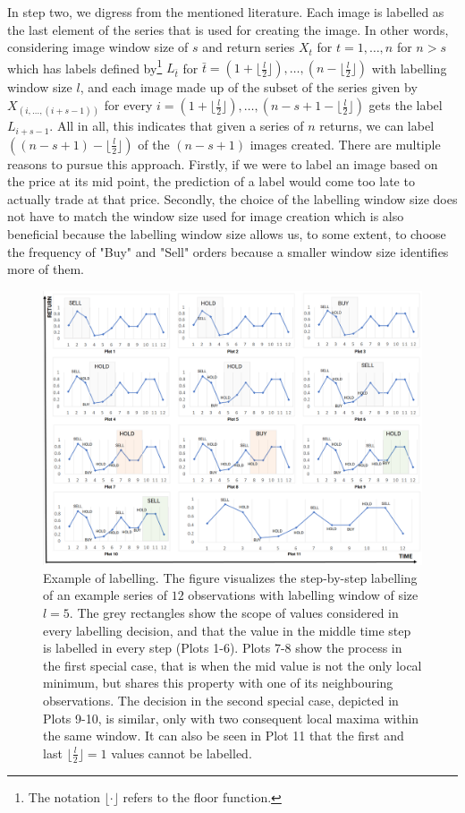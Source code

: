 \documentclass[12pt, a4paper]{article}
\begin{document}
In step two, we digress from the mentioned literature. Each image is labelled as the last element of the series that is used for creating the image. In other words, considering image window size of $s$ and return series $X_t$ for $t = 1, \dots, n$ for $n > s$ which has labels defined by\footnote{The notation $\lfloor \cdot \rfloor$ refers to the floor function.} 
$L_{\bar{t}}$ for 
$\bar{t} = \left(1+\lfloor \frac{l}{2} \rfloor\right), \dots, \left(n-\lfloor \frac{l}{2} \rfloor\right)$ with labelling window size $l$, and each image made up of the subset of the series given by
$X_{(i,\dots,(i+s-1))}$  
for every
$i = \left(1+\lfloor \frac{l}{2} \rfloor\right), \dots, \left(n-s+1-\lfloor \frac{l}{2} \rfloor\right)$ gets the label $L_{i+s-1}$. All in all, this indicates that given a series of $n$ returns, we can label $\left((n - s + 1)-\lfloor \frac{l}{2} \rfloor\right)$ of the $(n - s + 1)$ images created.
There are multiple reasons to pursue this approach. Firstly, if we were to label an image based on the price at its mid point, the prediction of a label would come too late to actually trade at that price. Secondly, the choice of the labelling window size does not have to match the window size used for image creation which is also beneficial because the labelling window size allows us, to some extent, to choose the frequency of "Buy" and "Sell" orders because a smaller window size identifies more of them. 

\begin{figure}[ht]
    \centering
    \includegraphics[width=\textwidth]{images/Labelling.png}
    \caption{Example of labelling. The figure visualizes the step-by-step labelling of an example series of $12$ observations with labelling window of size $l=5$. The grey rectangles show the scope of values considered in every labelling decision, and that the value in the middle time step is labelled in every step (Plots 1-6). Plots 7-8 show the process in the first special case, that is when the mid value is not the only local minimum, but shares this property with one of its neighbouring observations. The decision in the second special case, depicted in Plots 9-10, is similar, only with two consequent local maxima within the same window. It can also be seen in Plot 11 that the first and last $\lfloor \frac{l}{2} \rfloor = 1$ values cannot be labelled.}
    \label{fig:Labelling}
\end{figure}
\end{document}
